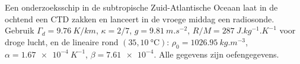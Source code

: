\begin{problem}
\label{pb:b1:fluid-envelopes-structure:1}
Een onderzoeksschip in de subtropische Zuid-Atlantische Oceaan laat in de ochtend een CTD zakken en lanceert in de vroege middag een radiosonde. Gebruik $\Gamma_d =
\qty{9.76}{K/km}$, $\kappa = 2/7$, $g = \qty{9.81}{m.s^{-2}}$, $R/M =
\qty{287}{J.kg^{-1}.K^{-1}}$ voor droge lucht, en de lineaire  rond $(35, \qty{10}{\celsius})$: $\rho_0 = \qty{1026.95}{kg.m^{-3}}$,
$\alpha = \qty{1.67e-4}{K^{-1}}$, $\beta = \num{7.61e-4}$. Alle gegevens zijn
oefengegevens.


\end{problem}
